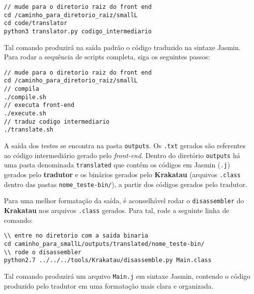 \begin{lstlisting}
// mude para o diretorio raiz do front end
cd /caminho_para_diretorio_raiz/smallL
cd code/translator
python3 translator.py codigo_intermediario
\end{lstlisting}

Tal comando produzirá na saída padrão o código traduzido na sintaxe Jasmin. Para rodar a sequência de scripts completa, siga os seguintes passos:

\begin{lstlisting}
// mude para o diretorio raiz do front end
cd /caminho_para_diretorio_raiz/smallL
// compila
./compile.sh
// executa front-end
./execute.sh
// traduz codigo intermediario
./translate.sh
\end{lstlisting}

A saída dos testes se encontra na pasta \texttt{outputs}. Os \texttt{.txt} gerados são referentes ao código intermediário gerado pelo \textit{front-end}. Dentro do diretório \texttt{outputs} há uma pasta denominada \texttt{translated} que contém os códigos em Jasmin (\texttt{.j}) gerados pelo \textbf{tradutor} e os binários gerados pelo \textbf{Krakatau} (arquivos \texttt{.class} dentro das pastas \texttt{nome\_teste-bin/}), a partir dos códigos gerados pelo tradutor.

Para uma melhor formatação da saída, é aconselhável rodar o \texttt{disassembler} do \textbf{Krakatau} nos arquivos \texttt{.class} gerados. Para tal, rode a seguinte linha de comando:

\begin{lstlisting}
\\ entre no diretorio com a saida binaria
cd caminho_para_smallL/outputs/translated/nome_teste-bin/
\\ rode o disassembler
python2.7 ../../../tools/Krakatau/disassemble.py Main.class
\end{lstlisting}

Tal comando produzirá um arquivo \texttt{Main.j} em sintaxe Jasmin, contendo o código produzido pelo tradutor em uma formatação mais clara e organizada.
